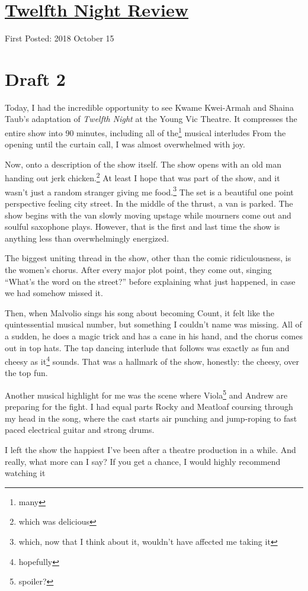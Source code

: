 \documentclass[12pt]{article}[titlepage]
\newcommand{\say}[1]{``#1''}
\newcommand{\1}{\={a}}
\newcommand{\2}{\={e}}
\newcommand{\3}{\={\i}}
\newcommand{\4}{\=o}
\newcommand{\5}{\=u}
\newcommand{\6}{\={A}}
\renewcommand{\,}{\textsuperscript{,}}
\begin{document}
\doublespacing
\section{\href{twelfth-night.html}{Twelfth Night Review}}
First Posted: 2018 October 15
\section{Draft 2}
Today, I had the incredible opportunity to see Kwame Kwei-Armah and Shaina Taub's adaptation of \textit{Twelfth Night} at the Young Vic Theatre.
It compresses the entire show into 90 minutes, including all of the\footnote{many} musical interludes
From the opening until the curtain call, I was almost overwhelmed with joy.

Now, onto a description of the show itself.
The show opens with an old man handing out jerk chicken.\footnote{which was delicious}
At least I hope that was part of the show, and it wasn't just a random stranger giving me food.\footnote{which, now that I think about it, wouldn't have affected me taking it}
The set is a beautiful one point perspective feeling city street.
In the middle of the thrust, a van is parked.
The show begins with the van slowly moving upstage while mourners come out and soulful saxophone plays.
However, that is the first and last time the show is anything less than overwhelmingly energized.

The biggest uniting thread in the show, other than the comic ridiculousness, is the women's chorus.
After every major plot point, they come out, singing \say{What's the word on the street?} before explaining what just happened, in case we had somehow missed it.

Then, when Malvolio sings his song about becoming Count, it felt like the quintessential musical number, but something I couldn't name was missing.
All of a sudden, he does a magic trick and has a cane in his hand, and the chorus comes out in top hats.
The tap dancing interlude that follows was exactly as fun and cheesy as it\footnote{hopefully} sounds.
That was a hallmark of the show, honestly: the cheesy, over the top fun.

Another musical highlight for me was the scene where Viola\footnote{spoiler?} and Andrew are preparing for the fight.
I had equal parts Rocky and Meatloaf coursing through my head in the song, where the cast starts air punching and jump-roping to fast paced electrical guitar and strong drums.

I left the show the happiest I've been after a theatre production in a while.
And really, what more can I say?
If you get a chance, I would highly recommend watching it
\end{document}
